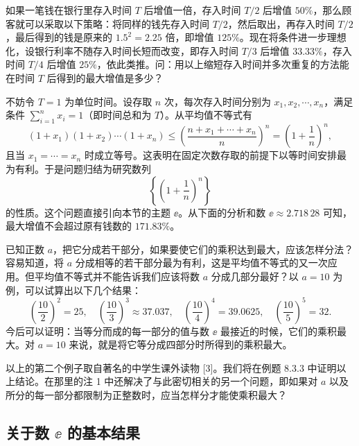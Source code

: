 \begin{xexample}[2.5.1]
如果一笔钱在银行里存入时间 $T$ 后增值一倍，存入时间 $T/2$ 后增值 $50\%$，那么顾客就可以采取以下策略：将同样的钱先存入时间 $T/2$，然后取出，再存入时间 $T/2$，最后得到的钱是原来的 $1.5^2=2.25$ 倍，即增值 $125\%$。现在将条件进一步理想化，设银行利率不随存入时间长短而改变，即存入时间 $T/3$ 后增值 $33.33\%$，存入时间 $T/4$ 后增值 $25\%$，依此类推。问：用以上缩短存入时间并多次重复的方法能在时间 $T$ 后得到的最大增值是多少？
\end{xexample}
\begin{xsolution}
不妨令 $T=1$ 为单位时间。设存取 $n$ 次，每次存入时间分别为 $x_1,x_2,\cdots,x_n$，满足条件 $\sum_{i=1}^n x_i=1$（即时间总和为 $T$）。从平均值不等式有
\[
  (1+x_1)(1+x_2)\cdots(1+x_n)
  \le\left(\frac{n+x_1+\cdots+x_n}{n}\right)^n
  =\left(1+\frac1n\right)^n,
\]
且当 $x_1=\cdots=x_n$ 时成立等号。这表明在固定次数存取的前提下以等时间安排最为有利。于是问题归结为研究数列
\[
  \left\{\left(1+\frac1n\right)^n\right\}
\]
的性质。这个问题直接引向本节的主题 $\ee$。从下面的分析和数 $\ee\approx2.718\,28$ 可知，最大增值不会超过原有钱数的 $171.83\%$。
\end{xsolution}

\begin{xexample}[2.5.2]
已知正数 $a$，把它分成若干部分，如果要使它们的乘积达到最大，应该怎样分法？容易知道，将 $a$ 分成相等的若干部分最为有利，这是平均值不等式的又一次应用。但平均值不等式并不能告诉我们应该将数 $a$ 分成几部分最好？以 $a=10$ 为例，可以试算出以下几个结果：
\[
  \left(\frac{10}{2}\right)^2=25,\quad
  \left(\frac{10}{3}\right)^3\approx37.037,\quad
  \left(\frac{10}{4}\right)^4=39.0625,\quad
  \left(\frac{10}{5}\right)^5=32.
\]
今后可以证明：当等分而成的每一部分的值与数 $\ee$ 最接近的时候，它们的乘积最大。对 $a=10$ 来说，就是将它等分成四部分时所得到的乘积最大。
\end{xexample}

\begin{xremark}
以上的第二个例子取自著名的中学生课外读物 [3]。我们将在例题 8.3.3 中证明以上结论。在那里的注 1 中还解决了与此密切相关的另一个问题，即如果对 $a$ 以及所分的每一部分都限制为正整数时，应当怎样分才能使乘积最大？
\end{xremark}

\subsection{\texorpdfstring{关于数 $\ee$ 的基本结果}{关于数 e 的基本结果}}

